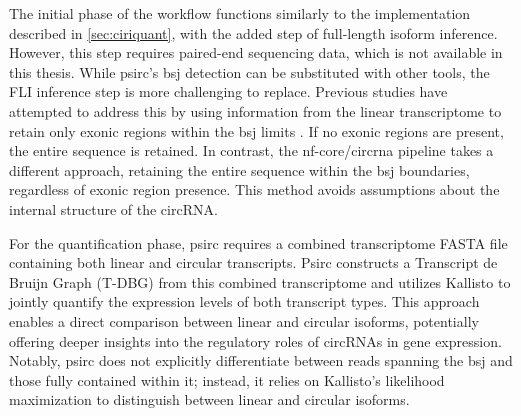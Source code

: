 The initial phase of the workflow functions similarly to the implementation
described in \cref{sec:ciriquant}, with the added step of full-length isoform
inference.
However, this step requires paired-end sequencing data, which is not available
in this thesis.
While psirc's \gls{bsj} detection can be substituted with other tools, the FLI
inference step is more challenging to replace.
Previous studies have attempted to address this by using information from the
linear transcriptome to retain only exonic regions within the \gls{bsj} limits
\supercite{hoffmann_circrna-sponging_2023}.
If no exonic regions are present, the entire sequence is retained.
In contrast, the nf-core/circrna pipeline takes a different approach, retaining
the entire sequence within the \gls{bsj} boundaries, regardless of exonic
region presence.
This method avoids assumptions about the internal structure of the circRNA.

For the quantification phase, psirc requires a combined transcriptome FASTA
file containing both linear and circular transcripts.
Psirc constructs a Transcript de Bruijn Graph (T-DBG) from this combined
transcriptome and utilizes Kallisto to jointly quantify the expression levels
of both transcript types\supercite{yu_quantifying_2021}.
This approach enables a direct comparison between linear and circular isoforms,
potentially offering deeper insights into the regulatory roles of circRNAs in
gene expression.
Notably, psirc does not explicitly differentiate between reads spanning the
\gls{bsj} and those fully contained within it; instead, it relies on Kallisto's
likelihood maximization to distinguish between linear and circular
isoforms\supercite{yu_quantifying_2021}.
